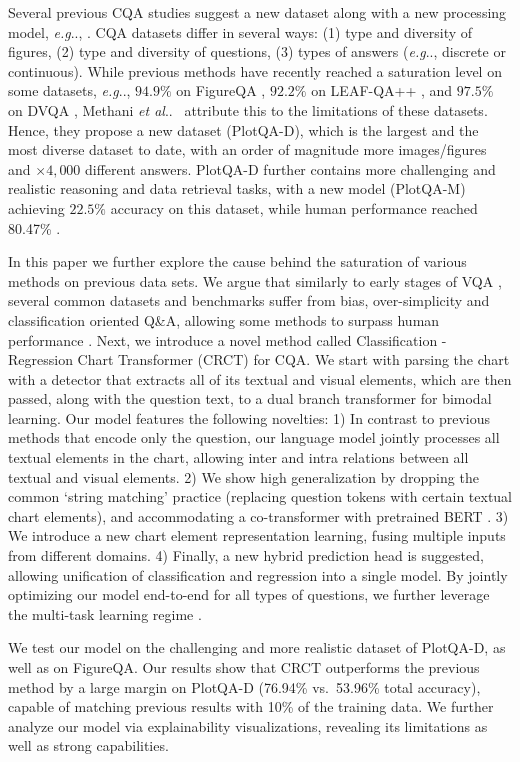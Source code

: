 \documentclass[runningheads]{llncs}
\makeatletter
\newcommand\our[1][]{CRCT\xspace}
\newcommand\ourFullname[1][]{Classification - Regression Chart Transformer (\our)\xspace}
\DeclareRobustCommand\onedot{\futurelet\@let@token\@onedot}
\def\@onedot{\ifx\@let@token.\else.\null\fi\xspace}
\def\eg{\emph{e.g}\onedot} \def\Eg{\emph{E.g}\onedot}
\def\etal{\emph{et al}\onedot}
\makeatother
\begin{document}
Several previous CQA studies suggest a new dataset along with a new processing model, \eg, \cite{figureqa,dvqa,plotqa, chaudhry2019leafqa}. 
CQA datasets differ in several ways: (1) type and diversity of figures, (2) type and diversity of questions, (3) types of answers (\eg, discrete or continuous). While previous methods have recently reached a saturation level on some datasets, \eg, $94.9\%$ on FigureQA \cite{figureqa}, $92.2\%$ on LEAF-QA++ \cite{chartqa}, and $97.5\%$ on DVQA \cite{dvqa}, Methani \etal~\cite{plotqa} attribute this to the limitations of these datasets. Hence, they propose a new dataset (PlotQA-D), which is the largest and the most diverse dataset to date, with an order of magnitude more images/figures and $\times 4,000$ different answers. PlotQA-D further contains more challenging and realistic reasoning and data retrieval tasks, with a new model (PlotQA-M) achieving $22.5\%$ accuracy on this dataset, while human performance reached 80.47\% \cite{plotqa}.


In this paper we further explore the cause behind the saturation of various methods on previous data sets. We argue that similarly to early stages of VQA \cite{makingVinVQAmatter_CVPR2017}, several common datasets and benchmarks suffer from bias, over-simplicity and classification oriented Q\&A, allowing some methods to surpass human performance \cite{chartqa,prefil}. Next, we introduce a novel method called \ourFullname for CQA. We start with parsing the chart with a detector that extracts all of its textual and visual elements, which are then passed, along with the question text, to a dual branch transformer for bimodal learning. Our model features the following novelties: 1) In contrast to previous methods that encode only the question, our language model jointly processes all textual elements in the chart, allowing inter and intra relations between all textual and visual elements. 2) We show high generalization by dropping the common `string matching' practice (replacing question tokens with certain textual chart elements), and accommodating a co-transformer with pretrained BERT \cite{devlin2019bert}.  3) We introduce a new chart element representation learning, fusing multiple inputs from different domains. 4) Finally, a new hybrid prediction head is suggested, allowing unification of classification and regression into a single model. By jointly optimizing our model end-to-end for all types of questions, we further leverage the multi-task learning regime \cite{zhang2021survey}. 


We test our model on the challenging and more realistic dataset of PlotQA-D, as well as on FigureQA. Our results show that \our outperforms the previous method by a large margin on PlotQA-D (76.94\% vs.~53.96\% total accuracy), capable of matching previous results with 10\% of the training data.
We further analyze our model via explainability visualizations, revealing its limitations as well as strong capabilities.
\end{document}

